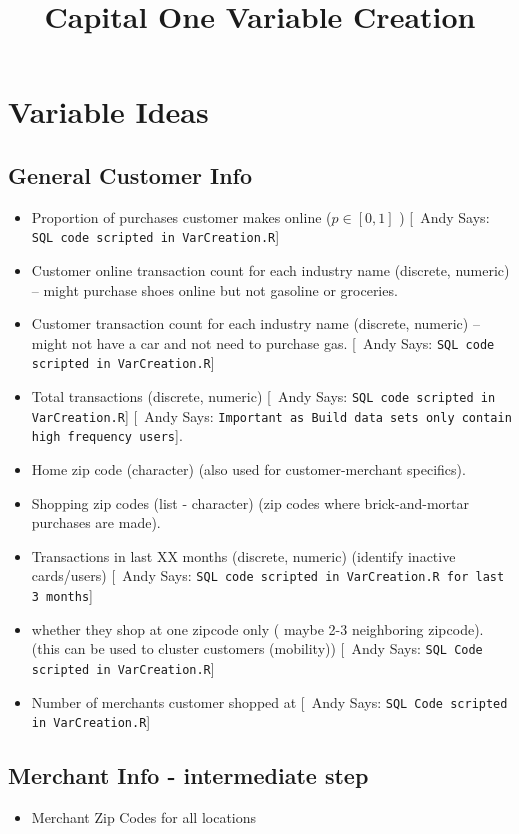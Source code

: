 \documentclass{article}
\begin{document}
  \title{\bf Capital One Variable Creation}

 \maketitle
\newcommand{\ac}[1]{[{\color{red}\ Andy Says: {\tt #1}}]}

\section{Variable Ideas}

\subsection{General Customer Info}
\begin{itemize} 
\item Proportion of purchases customer makes online ($p \in [0,1]$ ) \ac{SQL code scripted in VarCreation.R}
\item Customer online transaction count for each industry name (discrete, numeric) -- might purchase shoes online but not gasoline or groceries.
\item Customer transaction count for each industry name (discrete, numeric) -- might not have a car and not need to purchase gas. \ac{SQL code scripted in VarCreation.R}
\item Total transactions  (discrete, numeric) \ac{SQL code scripted in VarCreation.R}  \ac{Important as Build data sets only contain high frequency users}.
\item Home zip code (character) (also used for customer-merchant specifics).
\item Shopping zip codes (list - character) (zip codes where brick-and-mortar purchases are made).
\item Transactions in last XX months (discrete, numeric) (identify inactive cards/users) \ac{SQL code scripted in VarCreation.R for last 3 months}
\item whether they shop at one zipcode only ( maybe 2-3 neighboring zipcode). (this can be used to cluster customers (mobility)) \ac{SQL Code scripted in VarCreation.R}
\item Number of merchants customer shopped at \ac{SQL Code scripted in VarCreation.R}
\end{itemize}

\subsection{Merchant Info - intermediate step}
\begin{itemize}
\item Merchant Zip Codes for all locations 
\end{itemize}
\end{document}
